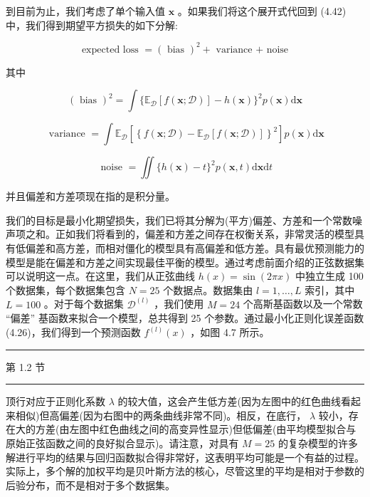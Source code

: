 \documentclass[10pt]{report}
\newcommand{\HRule}{\begin{center}\rule{0.9\linewidth}{0.2mm}\end{center}}
\begin{document}
到目前为止，我们考虑了单个输入值 \(\mathbf{x}\) 。如果我们将这个展开式代回到 (4.42) 中，我们得到期望平方损失的如下分解:

\[
\text{ expected loss } = {\left( \text{ bias }\right) }^{2} + \text{ variance + noise } \tag{4.46}
\]

其中

\[
{\left( \text{ bias }\right) }^{2} = \int \{ {\mathbb{E}}_{\mathcal{D}}\left\lbrack  {f\left( {\mathbf{x};\mathcal{D}}\right) }\right\rbrack   - h\left( \mathbf{x}\right) {\} }^{2}p\left( \mathbf{x}\right) \mathrm{d}\mathbf{x} \tag{4.47}
\]

\[
\text{ variance } = \int {\mathbb{E}}_{\mathcal{D}}\left\lbrack  {\left\{  f\left( \mathbf{x};\mathcal{D}\right)  - {\mathbb{E}}_{\mathcal{D}}\left\lbrack  f\left( \mathbf{x};\mathcal{D}\right) \right\rbrack  \right\}  }^{2}\right\rbrack  p\left( \mathbf{x}\right) \mathrm{d}\mathbf{x} \tag{4.48}
\]

\[
\text{ noise } = \iint \{ h\left( \mathbf{x}\right)  - t{\} }^{2}p\left( {\mathbf{x},t}\right) \mathrm{d}\mathbf{x}\mathrm{d}t \tag{4.49}
\]

并且偏差和方差项现在指的是积分量。

我们的目标是最小化期望损失，我们已将其分解为(平方)偏差、方差和一个常数噪声项之和。正如我们将看到的，偏差和方差之间存在权衡关系，非常灵活的模型具有低偏差和高方差，而相对僵化的模型具有高偏差和低方差。具有最优预测能力的模型是能在偏差和方差之间实现最佳平衡的模型。通过考虑前面介绍的正弦数据集可以说明这一点。在这里，我们从正弦曲线 \(h\left( x\right)  = \sin \left( {2\pi x}\right)\) 中独立生成 100 个数据集，每个数据集包含 \(N = {25}\) 个数据点。数据集由 \(l = 1,\ldots ,L\) 索引，其中 \(L = {100}\) 。对于每个数据集 \({\mathcal{D}}^{\left( l\right) }\) ，我们使用 \(M = {24}\) 个高斯基函数以及一个常数 “偏差” 基函数来拟合一个模型，总共得到 25 个参数。通过最小化正则化误差函数 (4.26)，我们得到一个预测函数 \({f}^{\left( l\right) }\left( x\right)\) ，如图 4.7 所示。

\HRule

第 1.2 节

\HRule

顶行对应于正则化系数 \(\lambda\) 的较大值，这会产生低方差(因为左图中的红色曲线看起来相似)但高偏差(因为右图中的两条曲线非常不同)。相反，在底行， \(\lambda\) 较小，存在大的方差(由左图中红色曲线之间的高变异性显示)但低偏差(由平均模型拟合与原始正弦函数之间的良好拟合显示)。请注意，对具有 \(M = {25}\) 的复杂模型的许多解进行平均的结果与回归函数拟合得非常好，这表明平均可能是一个有益的过程。实际上，多个解的加权平均是贝叶斯方法的核心，尽管这里的平均是相对于参数的后验分布，而不是相对于多个数据集。
\end{document}
